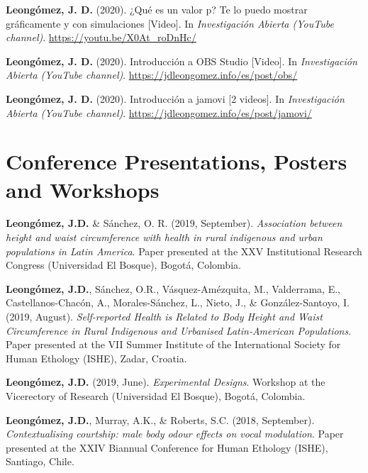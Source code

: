 \documentclass[11pt, a4paper]{awesome-cv}
\begin{document}
\leavevmode\hypertarget{ref-leongomezValorP2020}{}%
\textbf{Leongómez, J. D.} (2020). ¿Qué es un valor p? Te lo puedo mostrar gráficamente y con simulaciones {[}Video{]}. In \emph{Investigación Abierta (YouTube channel)}. \url{https://youtu.be/X0At_roDnHc/}

\leavevmode\hypertarget{ref-leongomezIntroduccionOBSStudio2020}{}%
\textbf{Leongómez, J. D.} (2020). Introducción a OBS Studio {[}Video{]}. In \emph{Investigación Abierta (YouTube channel)}. \url{https://jdleongomez.info/es/post/obs/}

\leavevmode\hypertarget{ref-leongomezIntroduccionJamovi2020}{}%
\textbf{Leongómez, J. D.} (2020). Introducción a jamovi {[}2 videos{]}. In \emph{Investigación Abierta (YouTube channel)}. \url{https://jdleongomez.info/es/post/jamovi/}

\endgroup

\hypertarget{conference-presentations-posters-and-workshops}{%
\section{Conference Presentations, Posters and Workshops}\label{conference-presentations-posters-and-workshops}}

\begingroup
\setlength{\parindent}{-0.5in}
\setlength{\leftskip}{0.5in}

\textbf{Leongómez, J.D.} \& Sánchez, O. R. (2019, September). \emph{Association between height and waist circumference with health in rural indigenous and urban populations in Latin America}. Paper presented at the XXV Institutional Research Congress (Universidad El Bosque), Bogotá, Colombia.

\textbf{Leongómez, J.D.}, Sánchez, O.R., Vásquez-Amézquita, M., Valderrama, E., Castellanos-Chacón, A., Morales-Sánchez, L., Nieto, J., \& González-Santoyo, I. (2019, August). \emph{Self-reported Health is Related to Body Height and Waist Circumference in Rural Indigenous and Urbanised Latin-American Populations}. Paper presented at the VII Summer Institute of the International Society for Human Ethology (ISHE), Zadar, Croatia.

\textbf{Leongómez, J.D.} (2019, June). \emph{Experimental Designs}. Workshop at the Vicerectory of Research (Universidad El Bosque), Bogotá, Colombia.

\textbf{Leongómez, J.D.}, Murray, A.K., \& Roberts, S.C. (2018, September). \emph{Contextualising courtship: male body odour effects on vocal modulation}. Paper presented at the XXIV Biannual Conference for Human Ethology (ISHE), Santiago, Chile.
\end{document}
